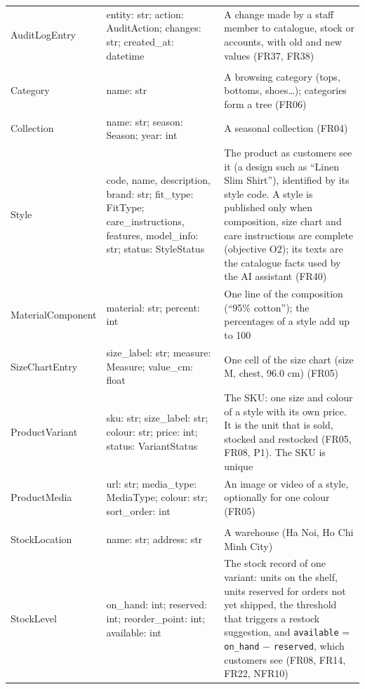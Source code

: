 {\begin{xltabular}{\textwidth}{@{}L{3.0cm} L{4.8cm} Y@{}}
\textsf{AuditLogEntry} & entity: str; action: AuditAction; changes: str; created\_at: datetime & A change made by a staff member to catalogue, stock or accounts, with old and new values (FR37, FR38) \\ \addlinespace
{} \\
\textsf{Category} & name: str & A browsing category (tops, bottoms, shoes\ldots); categories form a tree (FR06) \\
\textsf{Collection} & name: str; season: Season; year: int & A seasonal collection (FR04) \\
\textsf{Style} & code, name, description, brand: str; fit\_type: FitType; care\_instructions, features, model\_info: str; status: StyleStatus & The product as customers see it (a design such as ``Linen Slim Shirt''), identified by its style code. A style is published only when composition, size chart and care instructions are complete (objective O2); its texts are the catalogue facts used by the AI assistant (FR40) \\
\textsf{MaterialComponent} & material: str; percent: int & One line of the composition (``95\% cotton''); the percentages of a style add up to 100 \\
\textsf{SizeChartEntry} & size\_label: str; measure: Measure; value\_cm: float & One cell of the size chart (size M, chest, 96.0 cm) (FR05) \\
\textsf{ProductVariant} & sku: str; size\_label: str; colour: str; price: int; status: VariantStatus & The SKU: one size and colour of a style with its own price. It is the unit that is sold, stocked and restocked (FR05, FR08, P1). The SKU is unique \\
\textsf{ProductMedia} & url: str; media\_type: MediaType; colour: str; sort\_order: int & An image or video of a style, optionally for one colour (FR05) \\ \addlinespace
{} \\
\textsf{StockLocation} & name: str; address: str & A warehouse (Ha Noi, Ho Chi Minh City) \\
\textsf{StockLevel} & on\_hand: int; reserved: int; reorder\_point: int; available: int & The stock record of one variant: units on the shelf, units reserved for orders not yet shipped, the threshold that triggers a restock suggestion, and \texttt{available} = \texttt{on\_hand} $-$ \texttt{reserved}, which customers see (FR08, FR14, FR22, NFR10) \\

\end{xltabular}}
